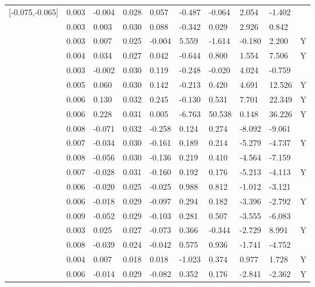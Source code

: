 \begin{table}[ht]
\begin{tabular}{llllllllll}
  [-0.075,-0.065] &  0.003 & -0.004 &  0.028 &  0.057 &  -0.487 &  -0.064 &   2.054 &  -1.402 &  \\ 
  [-0.065,-0.055] &  0.003 &  0.003 &  0.030 &  0.088 &  -0.342 &   0.029 &   2.926 &   0.842 &  \\ 
  [-0.055,-0.045] &  0.003 &  0.007 &  0.025 & -0.004 &   5.559 &  -1.614 &  -0.180 &   2.200 & Y \\ 
  [-0.045,-0.035] &  0.004 &  0.034 &  0.027 &  0.042 &  -0.644 &   0.800 &   1.554 &   7.506 & Y \\ 
  [-0.035,-0.025] &  0.003 & -0.002 &  0.030 &  0.119 &  -0.248 &  -0.020 &   4.024 &  -0.759 &  \\ 
  [-0.025,-0.015] &  0.005 &  0.060 &  0.030 &  0.142 &  -0.213 &   0.420 &   4.691 &  12.526 & Y \\ 
  [-0.015,-0.005] &  0.006 &  0.130 &  0.032 &  0.245 &  -0.130 &   0.531 &   7.701 &  22.349 & Y \\ 
  [-0.005,0.005] &  0.006 &  0.228 &  0.031 &  0.005 &  -6.763 &  50.538 &   0.148 &  36.226 & Y \\ 
  [0.005,0.015] &  0.008 & -0.071 &  0.032 & -0.258 &   0.124 &   0.274 &  -8.092 &  -9.061 &  \\ 
  [0.015,0.025] &  0.007 & -0.034 &  0.030 & -0.161 &   0.189 &   0.214 &  -5.279 &  -4.737 & Y \\ 
  [0.025,0.035] &  0.008 & -0.056 &  0.030 & -0.136 &   0.219 &   0.410 &  -4.564 &  -7.159 &  \\ 
  [0.035,0.045] &  0.007 & -0.028 &  0.031 & -0.160 &   0.192 &   0.176 &  -5.213 &  -4.113 & Y \\ 
  [0.045,0.055] &  0.006 & -0.020 &  0.025 & -0.025 &   0.988 &   0.812 &  -1.012 &  -3.121 &  \\ 
  [0.055,0.065] &  0.006 & -0.018 &  0.029 & -0.097 &   0.294 &   0.182 &  -3.396 &  -2.792 & Y \\ 
  [0.065,0.075] &  0.009 & -0.052 &  0.029 & -0.103 &   0.281 &   0.507 &  -3.555 &  -6.083 &  \\ 
  [0.075,0.085] &  0.003 &  0.025 &  0.027 & -0.073 &   0.366 &  -0.344 &  -2.729 &   8.991 & Y \\ 
  [0.085,0.095] &  0.008 & -0.039 &  0.024 & -0.042 &   0.575 &   0.936 &  -1.741 &  -4.752 &  \\ 
  [0.095,0.105] &  0.004 &  0.007 &  0.018 &  0.018 &  -1.023 &   0.374 &   0.977 &   1.728 & Y \\ 
  [0.105,0.115] &  0.006 & -0.014 &  0.029 & -0.082 &   0.352 &   0.176 &  -2.841 &  -2.362 & Y \\ 

\end{tabular}
\end{table}

